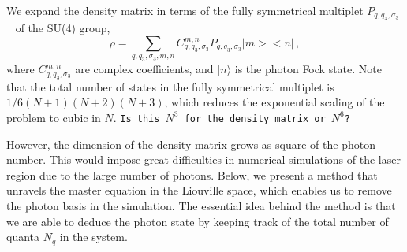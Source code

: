 \documentclass[aps,
twocolumn,
showpacs,
superscriptaddress,groupedaddress]{revtex4}
\newcommand{\dmcomment}[1]{{\tt #1}}
\begin{document}
We expand the density matrix in terms of the fully symmetrical multiplet
$P_{q,q_3,\sigma_3}$~\cite{PhysRevA.87.062101} of the SU(4) group,
\begin{equation}\label{ex}
  \rho=\sum_{q,q_3,\sigma_3,m,n} C_{q,q_3,\sigma_3}^{m,n}
  P_{q,q_3,\sigma_3}\bigl|m\bigr>\bigl<n\bigr|\,,
\end{equation}
where $C_{q,q_3,\sigma_3}^{m,n}$ are complex coefficients, and
$|n\rangle$ is the photon Fock state. Note that the total number of
states in the fully symmetrical multiplet is $1/6 (N+1)(N+2)(N+3)$,
which reduces the exponential scaling of the problem to cubic in $N$.
\dmcomment{Is this $N^3$ for the density matrix or $N^6$?}

However, the dimension of the density matrix grows as square of
the photon number.  This would impose great difficulties in numerical
simulations of the laser region due to the large number of photons.
Below, we present a method that unravels the master equation in the
Liouville space, which enables us to remove the photon basis in the
simulation. The essential idea behind the method is that we are able to
deduce the photon state by keeping track of the total number of quanta
$N_q$ in the system.
\end{document}
